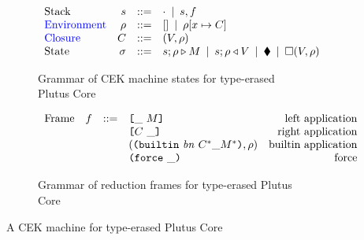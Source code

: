 \documentclass[../plutus-core-specification.tex]{subfiles}
\begin{document}
\begin{figure}[H]
\begin{subfigure}[c]{\linewidth}
    \centering
    \[\begin{array}{lrclr}
        \textrm{Stack} & s      & ::= & \cdot \enspace | \enspace s,f\\
 \textcolor{blue}{ \textrm{Environment}} & \rho & ::= & [] \enspace | \enspace \rho[x \mapsto C] \\
        \textcolor{blue}{ \textrm{Closure}} & C  & ::= & (V,\rho) \\
        \textrm{State} & \sigma & ::= & s;\rho \triangleright M \enspace | \enspace s;\rho \triangleleft V  \enspace | \enspace \blacklozenge{} \enspace | \enspace \square (V,\rho)\\
    \end{array}\]

    \caption{Grammar of CEK machine states for type-erased Plutus Core}
    \label{fig:untyped-cek-frames}
\end{subfigure}
\begin{subfigure}[c]{\linewidth}
    \centering
    \[\begin{array}{lrclr}
        \textrm{Frame} & f  & ::=   & \texttt{[} \_ ~ M \texttt{]}                  & \textrm{left application}\\
                       &   &     & \texttt{[} C ~ \_ \texttt{]}                    & \textrm{right application}\\
                       &   &     & (\texttt{(} \texttt{builtin} ~ \mathit{bn} ~ C^* \_ M^* \texttt{)}, \rho)  & \textrm{builtin application}\\
                       &   &     & \texttt{(} \texttt{force} ~ \_ \texttt{)}                          & \textrm{force}
    \end{array}\]
    \caption{Grammar of reduction frames for type-erased Plutus Core}
    \label{fig:untyped-cek-reduction-frames}
\end{subfigure}
\caption{A CEK machine for type-erased Plutus Core}
\end{figure}
\end{document}
